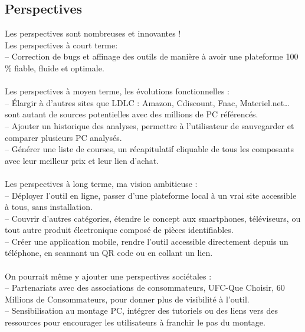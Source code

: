\documentclass[a4paper, 12pt, twoside]{article}
\begin{document}
	\subsection{Perspectives}
Les perspectives sont nombreuses et innovantes !\\
Les perspectives à court terme:\\ 
– Correction de bugs et affinage des outils de manière à avoir une plateforme 100 \% fiable, fluide et optimale.\\
\\
Les perspectives à moyen terme, les évolutions fonctionnelles : \\
– Élargir à d'autres sites que LDLC : Amazon, Cdiscount, Fnac, Materiel.net… sont autant de sources potentielles avec des millions de PC référencés.\\
– Ajouter un historique des analyses, permettre à l'utilisateur de sauvegarder et comparer plusieurs PC analysés.\\
– Générer une liste de courses, un récapitulatif cliquable de tous les composants avec leur meilleur prix et leur lien d'achat.\\
\\
Les perspectives à long terme, ma vision ambitieuse : \\
– Déployer l'outil en ligne, passer d'une plateforme local à un vrai site accessible à tous, sans installation.\\
– Couvrir d'autres catégories, étendre le concept aux smartphones, téléviseurs, ou tout autre produit électronique composé de pièces identifiables.\\
– Créer une application mobile, rendre l'outil accessible directement depuis un téléphone, en scannant un QR code ou en collant un lien.\\
\\
On pourrait même y ajouter une perspectives sociétales : \\
– Partenariats avec des associations de consommateurs, UFC-Que Choisir, 60 Millions de Consommateurs, pour donner plus de visibilité à l'outil.\\
– Sensibilisation au montage PC, intégrer des tutoriels ou des liens vers des ressources pour encourager les utilisateurs à franchir le pas du montage.
\end{document}

